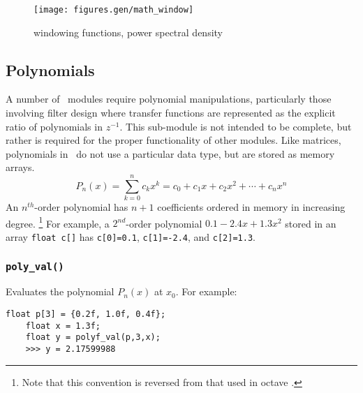 \begin{figure}
\centering
  \texttt{[image: figures.gen/math\_window]}
\caption{windowing functions, power spectral density}
\label{fig:module:math:window}
\end{figure}

\subsection{Polynomials}
\label{module:math:poly}
A number of \liquid\ modules require polynomial manipulations, particularly
those involving filter design where transfer functions are represented as the
explicit ratio of polynomials in $z^{-1}$.
This sub-module is not intended to be complete, but rather is required for
the proper functionality of other modules.
Like matrices, polynomials in \liquid\ do not use a particular data type, but
are stored as memory arrays.
\[
    P_n(x) = \sum_{k=0}^{n}{c_k x^k}
           = c_0 + c_1 x + c_2 x^2 + \cdots + c_n x^n
\]
An $n^{th}$-order polynomial has $n+1$ coefficients ordered in memory in
increasing degree.%
\footnote{Note that this convention is reversed from that used in octave
\cite{octave:web}.}
For example, a $2^{nd}$-order polynomial $0.1 -2.4x + 1.3x^2$ stored in an
array {\tt float c[]} has
{\tt c[0]=0.1},
{\tt c[1]=-2.4}, and
{\tt c[2]=1.3}.

\subsubsection{{\tt poly\_val()}}
\label{module:math:poly:polyf_val}
Evaluates the polynomial $P_n(x)$ at $x_0$.
For example:
\begin{Verbatim}[fontsize=\small]
    float p[3] = {0.2f, 1.0f, 0.4f};
    float x = 1.3f;
    float y = polyf_val(p,3,x);
    >>> y = 2.17599988
\end{Verbatim}

